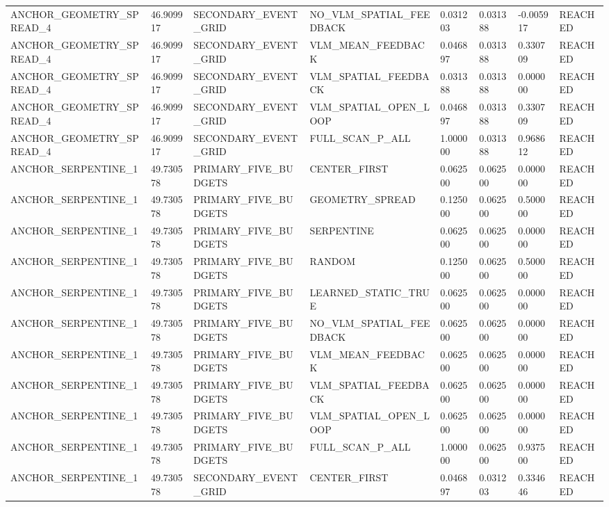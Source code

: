 \begin{tabular}{llllllll}
ANCHOR\_GEOMETRY\_SPREAD\_4 & 46.909917 & SECONDARY\_EVENT\_GRID & NO\_VLM\_SPATIAL\_FEEDBACK & 0.031203 & 0.031388 & -0.005917 & REACHED \\
ANCHOR\_GEOMETRY\_SPREAD\_4 & 46.909917 & SECONDARY\_EVENT\_GRID & VLM\_MEAN\_FEEDBACK & 0.046897 & 0.031388 & 0.330709 & REACHED \\
ANCHOR\_GEOMETRY\_SPREAD\_4 & 46.909917 & SECONDARY\_EVENT\_GRID & VLM\_SPATIAL\_FEEDBACK & 0.031388 & 0.031388 & 0.000000 & REACHED \\
ANCHOR\_GEOMETRY\_SPREAD\_4 & 46.909917 & SECONDARY\_EVENT\_GRID & VLM\_SPATIAL\_OPEN\_LOOP & 0.046897 & 0.031388 & 0.330709 & REACHED \\
ANCHOR\_GEOMETRY\_SPREAD\_4 & 46.909917 & SECONDARY\_EVENT\_GRID & FULL\_SCAN\_P\_ALL & 1.000000 & 0.031388 & 0.968612 & REACHED \\
ANCHOR\_SERPENTINE\_1 & 49.730578 & PRIMARY\_FIVE\_BUDGETS & CENTER\_FIRST & 0.062500 & 0.062500 & 0.000000 & REACHED \\
ANCHOR\_SERPENTINE\_1 & 49.730578 & PRIMARY\_FIVE\_BUDGETS & GEOMETRY\_SPREAD & 0.125000 & 0.062500 & 0.500000 & REACHED \\
ANCHOR\_SERPENTINE\_1 & 49.730578 & PRIMARY\_FIVE\_BUDGETS & SERPENTINE & 0.062500 & 0.062500 & 0.000000 & REACHED \\
ANCHOR\_SERPENTINE\_1 & 49.730578 & PRIMARY\_FIVE\_BUDGETS & RANDOM & 0.125000 & 0.062500 & 0.500000 & REACHED \\
ANCHOR\_SERPENTINE\_1 & 49.730578 & PRIMARY\_FIVE\_BUDGETS & LEARNED\_STATIC\_TRUE & 0.062500 & 0.062500 & 0.000000 & REACHED \\
ANCHOR\_SERPENTINE\_1 & 49.730578 & PRIMARY\_FIVE\_BUDGETS & NO\_VLM\_SPATIAL\_FEEDBACK & 0.062500 & 0.062500 & 0.000000 & REACHED \\
ANCHOR\_SERPENTINE\_1 & 49.730578 & PRIMARY\_FIVE\_BUDGETS & VLM\_MEAN\_FEEDBACK & 0.062500 & 0.062500 & 0.000000 & REACHED \\
ANCHOR\_SERPENTINE\_1 & 49.730578 & PRIMARY\_FIVE\_BUDGETS & VLM\_SPATIAL\_FEEDBACK & 0.062500 & 0.062500 & 0.000000 & REACHED \\
ANCHOR\_SERPENTINE\_1 & 49.730578 & PRIMARY\_FIVE\_BUDGETS & VLM\_SPATIAL\_OPEN\_LOOP & 0.062500 & 0.062500 & 0.000000 & REACHED \\
ANCHOR\_SERPENTINE\_1 & 49.730578 & PRIMARY\_FIVE\_BUDGETS & FULL\_SCAN\_P\_ALL & 1.000000 & 0.062500 & 0.937500 & REACHED \\
ANCHOR\_SERPENTINE\_1 & 49.730578 & SECONDARY\_EVENT\_GRID & CENTER\_FIRST & 0.046897 & 0.031203 & 0.334646 & REACHED \\

\end{tabular}
